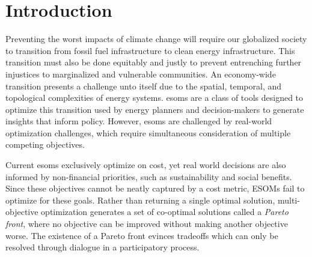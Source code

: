 \section{Introduction}





Preventing the worst impacts of climate change will require our globalized
society to transition from fossil fuel infrastructure to clean energy
infrastructure. This transition must also be done equitably and justly to
prevent entrenching further injustices to marginalized and vulnerable
communities. An economy-wide transition presents a challenge unto itself due to
the spatial, temporal, and topological complexities of energy systems.
\glspl{esom} are a class of tools designed to optimize this transition used by
energy planners and decision-makers to generate insights that inform policy.
However, \glspl{esom} are challenged by real-world optimization challenges,
which require simultaneous consideration of multiple competing objectives.

Current \glspl{esom} exclusively optimize on cost, yet real world decisions are
also informed by non-financial priorities, such as sustainability and social
benefits. Since these objectives cannot be neatly captured by a cost metric,
ESOMs fail to optimize for these goals.  Rather than returning a single optimal
solution, multi-objective optimization generates a set of co-optimal solutions
called a \textit{Pareto front}, where no objective can be improved without
making another objective worse. The existence of a Pareto front evinces
tradeoffs which can only be resolved through dialogue in a participatory
process. 

